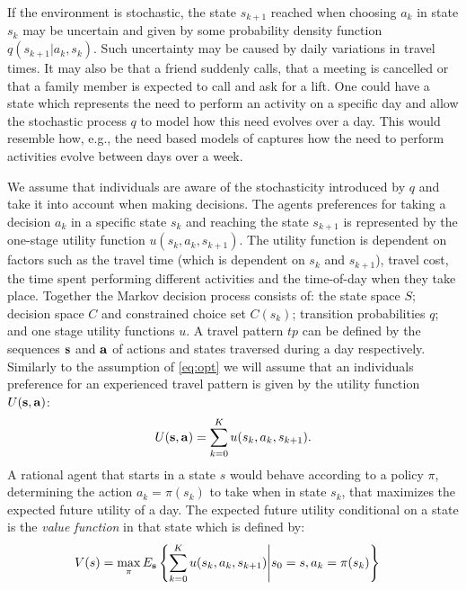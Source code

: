 If the environment is stochastic, the state $s_{k+1}$ reached when choosing $a_k$ in state $s_k$ may be uncertain and given by some probability density function $q(s_{k+1}|a_k,s_k)$. Such uncertainty may be caused by daily variations in travel times. It may also be that a friend suddenly calls, that a meeting is cancelled or that a family member is expected to call and ask for a lift. One could have a state which represents the need to perform an activity on a specific day and allow the stochastic process $q$ to model how this need evolves over a day. This would resemble how, e.g., the need based models of \citet{arentze11} captures how the need to perform activities evolve between days over a week. 

We assume that individuals are aware of the stochasticity introduced by $q$ and take it into account when making decisions. The agents preferences for taking a decision $a_k$ in a specific state $s_k$ and reaching the state $s_{k+1}$ is represented by the one-stage utility function $u(s_k,a_k,s_{k+1})$. The utility function is dependent on factors such as the travel time (which is dependent on $s_k$ and $s_{k+1}$), travel cost, the time spent performing different activities and the time-of-day when they take place. Together the Markov decision process consists of: the state space $S$; decision space $C$ and constrained choice set $C(s_k)$; transition probabilities $q$; and one stage utility functions $u$. A travel pattern $tp$ can be defined by the sequences $\mathbf{s}$ and $\mathbf{a}$ of actions and states traversed during a day respectively. Similarly to the assumption of \eqref{eq:opt} we will assume that an individuals preference for an experienced travel pattern is given by the utility function $U(\mathbf{s},\mathbf{a})$:
\begin{equation}
    U(\bs,\ba) = \sum_{k=0}^K u(s_k,a_k,s_{k+1}).
\end{equation}
A rational agent that starts in a state $s$ would behave according to a policy $\pi$, determining the action $a_k=\pi(s_k)$ to take when in state $s_k$, that maximizes the expected future utility  of a day. The expected future utility conditional on a state is the \emph{value function} in that state which is defined by: 
\begin{equation}\label{eq:vf}
\begin{aligned}
V(s) & = \max_{\pi} E_{\bs} \left\{ \sum_{k=0}^K u(s_k,a_k,s_{k+1})\middle | s_0 = s, a_k=\pi(s_k) \right\}  
\end{aligned}
\end{equation}
